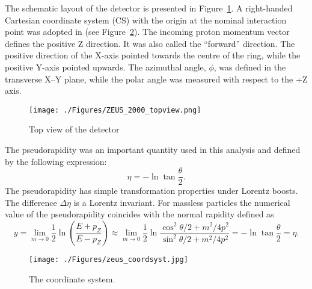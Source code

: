The schematic layout of the \zeus detector is presented in Figure~\ref{fig:zeus2d1}. A right-handed Cartesian coordinate system (CS) with the origin at the nominal interaction point was adopted in \zeus (see Figure~\ref{fig:zeus_coordsyst}). The incoming proton momentum vector defines the positive Z direction. It was also called the ``forward'' direction. The positive direction of the X-axis pointed towards the centre of the \hera ring, while the positive Y-axis pointed upwards. The azimuthal angle, $\phi$, was defined in the transverse X--Y plane, while the polar angle was measured with respect to the +Z axis. 
\begin{landscape}
\begin{figure}[htpb]
	\centering
		\texttt{[image: ./Figures/ZEUS\_2000\_topview.png]}
	\caption{Top view of the \zeus detector}
	\label{fig:zeus2d1}
\end{figure}
\end{landscape}

The pseudorapidity was an important quantity used in this analysis and defined by the following expression:
\begin{equation}
\eta = -\ln \tan \dfrac{\theta}{2}.
\label{eq:pseudorapidity}
\end{equation}
The pseudorapidity has simple transformation properties under Lorentz boosts. The difference $\Delta \eta$ is a Lorentz invariant. For massless particles the numerical value of the pseudorapidity coincides with the normal rapidity defined as 
\begin{equation}
y=\lim_{m\rightarrow 0}\frac{1}{2}\ln{\left(\frac{E+p_Z}{E-p_Z}\right)}\approx \lim_{m\rightarrow 0}\frac{1}{2}\ln{\frac{\cos^2{\theta/2}+m^2/4p^2}{\sin^2{\theta/2}+m^2/4p^2}} = -\ln \tan \dfrac{\theta}{2} = \eta.
\label{eq:rapidity}
\end{equation}
	
\begin{figure}[htpb]
	\centering
		\texttt{[image: ./Figures/zeus\_coordsyst.jpg]}
	\caption{The \zeus coordinate system.}
	\label{fig:zeus_coordsyst}
\end{figure}
